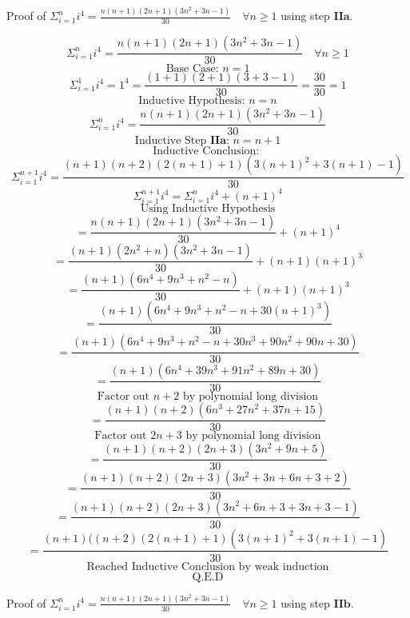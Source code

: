 \documentclass{article}
\begin{document}
Proof of $\Sigma_{i=1}^{n} i^4 = \frac{n(n + 1)(2n + 1)(3n^2 + 3n - 1)}{30} \quad \forall n \ge 1 $ using step $\textbf{IIa}$.

$$\Sigma_{i=1}^{n} i^4 = \frac{n(n + 1)(2n + 1)(3n^2 + 3n - 1)}{30} \quad \forall n \ge 1$$
$$\text{Base Case: } n = 1$$
$$\Sigma_{i=1}^{1} i^4  = 1^4 = \frac{(1 + 1)(2 + 1)(3 + 3 - 1)}{30} = \frac{30}{30} = 1 $$
$$\text{Inductive Hypothesis: } n = n$$
$$\Sigma_{i=1}^{n} i^4 = \frac{n(n + 1)(2n + 1)(3n^2 + 3n - 1)}{30} $$
$$\text{Inductive Step } \textbf{IIa} \text{: } n = n + 1$$
$$\text{Inductive Conclusion: }$$
$$\Sigma_{i=1}^{n + 1} i^4 = \frac{(n + 1)(n+2)(2(n + 1) +1)(3(n + 1) ^2 + 3(n + 1) - 1)}{30} $$
$$\Sigma_{i=1}^{n + 1} i^4 = \Sigma_{i=1}^{n} i^4 + (n+1)^4$$
$$\text{Using Inductive Hypothesis}$$
$$= \frac{n(n + 1)(2n + 1)(3n^2 + 3n - 1)}{30} + (n+1)^4$$
$$= \frac{(n + 1)(2n^2 + n)(3n^2 + 3n - 1)}{30} + (n+1)(n+1)^3$$
$$= \frac{(n + 1)(6n^4 + 9n^3 + n^2 -n)}{30} + (n+1)(n+1)^3$$
$$= \frac{(n + 1)(6n^4 + 9n^3 + n^2 -n + 30(n+1)^3)}{30}$$
$$= \frac{(n + 1)(6n^4 + 9n^3 + n^2 -n + 30n^3 + 90n^2 + 90n + 30)}{30}$$
$$= \frac{(n + 1)(6n^4 + 39n^3 + 91n^2 + 89n + 30)}{30}$$
$$\text{Factor out } n+2 \text{ by polynomial long division}$$
$$= \frac{(n + 1)(n+2)(6n^3 + 27n^2 + 37n + 15)}{30}$$
$$\text{Factor out } 2n+3 \text{ by polynomial long division}$$
$$= \frac{(n + 1)(n+2)(2n + 3)(3n^2 + 9n +5)}{30}$$
$$= \frac{(n + 1)(n+2)(2n + 3)(3n^2 + 3n + 6n + 3 + 2)}{30}$$
$$= \frac{(n + 1)(n+2)(2n + 3)(3n^2 + 6n + 3  + 3n + 3 - 1)}{30}$$
$$= \frac{(n + 1)((n+2)(2(n+1) + 1)(3(n+1)^2 + 3(n + 1) - 1)}{30}$$
$$\text{Reached Inductive Conclusion by weak induction}$$
$$\text{Q.E.D}$$

Proof of $\Sigma_{i=1}^{n} i^4 = \frac{n(n + 1)(2n + 1)(3n^2 + 3n - 1)}{30} \quad \forall n \ge 1 $ using step $\textbf{IIb}$.
\end{document}
